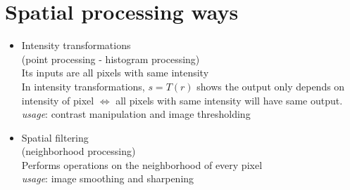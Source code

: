 \section{Spatial processing ways}

\begin{itemize}
\item \label{intensity transformation definition}
  Intensity transformations\\
  (point processing - histogram processing)\\
  Its inputs are all pixels with same intensity\\
  In intensity transformations, $s=T(r)$ shows the output only depends on
  intensity of pixel $\Leftrightarrow$  all pixels with same intensity will have
  same output.\\
  \emph{usage}: contrast manipulation and image thresholding
\item
  Spatial ﬁltering\\
  (neighborhood processing)\\
  Performs operations on the neighborhood of every pixel\\
  \emph{usage}: image smoothing and sharpening
\end{itemize}
